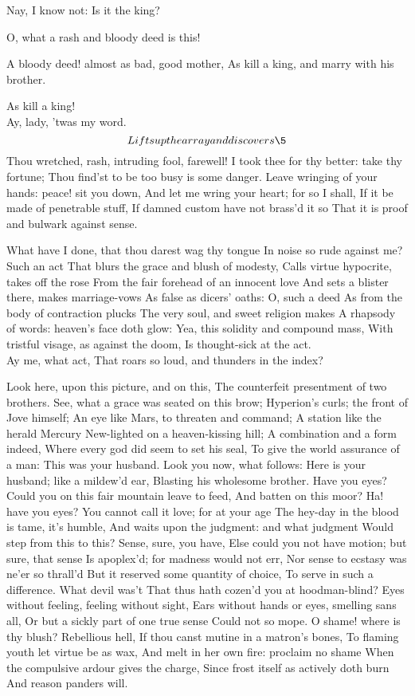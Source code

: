 \documentclass[11pt]{book}
\begin{document}
\1	Nay, I know not:
	Is it the king?

\3	O, what a rash and bloody deed is this!

\1	A bloody deed! almost as bad, good mother,
	As kill a king, and marry with his brother.

\3	As kill a king! \\

\1	                  Ay, lady, 'twas my word.
	\[Lifts up the array and discovers \5\]
	Thou wretched, rash, intruding fool, farewell!
	I took thee for thy better: take thy fortune;
	Thou find'st to be too busy is some danger.
	Leave wringing of your hands: peace! sit you down,
	And let me wring your heart; for so I shall,
	If it be made of penetrable stuff,
	If damned custom have not brass'd it so
	That it is proof and bulwark against sense.

\3	What have I done, that thou darest wag thy tongue
	In noise so rude against me? \\

\1	Such an act
	That blurs the grace and blush of modesty,
	Calls virtue hypocrite, takes off the rose
	From the fair forehead of an innocent love
	And sets a blister there, makes marriage-vows
	As false as dicers' oaths: O, such a deed
	As from the body of contraction plucks
	The very soul, and sweet religion makes
	A rhapsody of words: heaven's face doth glow:
	Yea, this solidity and compound mass,
	With tristful visage, as against the doom,
	Is thought-sick at the act. \\

\3	Ay me, what act,
	That roars so loud, and thunders in the index?

\1	Look here, upon this picture, and on this,
	The counterfeit presentment of two brothers.
	See, what a grace was seated on this brow;
	Hyperion's curls; the front of Jove himself;
	An eye like Mars, to threaten and command;
	A station like the herald Mercury
	New-lighted on a heaven-kissing hill;
	A combination and a form indeed,
	Where every god did seem to set his seal,
	To give the world assurance of a man:
	This was your husband. Look you now, what follows:
	Here is your husband; like a mildew'd ear,
	Blasting his wholesome brother. Have you eyes?
	Could you on this fair mountain leave to feed,
	And batten on this moor? Ha! have you eyes?
	You cannot call it love; for at your age
	The hey-day in the blood is tame, it's humble,
	And waits upon the judgment: and what judgment
	Would step from this to this? Sense, sure, you have,
	Else could you not have motion; but sure, that sense
	Is apoplex'd; for madness would not err,
	Nor sense to ecstasy was ne'er so thrall'd
	But it reserved some quantity of choice,
	To serve in such a difference. What devil was't
	That thus hath cozen'd you at hoodman-blind?
	Eyes without feeling, feeling without sight,
	Ears without hands or eyes, smelling sans all,
	Or but a sickly part of one true sense
	Could not so mope.
	O shame! where is thy blush? Rebellious hell,
	If thou canst mutine in a matron's bones,
	To flaming youth let virtue be as wax,
	And melt in her own fire: proclaim no shame
	When the compulsive ardour gives the charge,
	Since frost itself as actively doth burn
	And reason panders will. \\
\end{document}
